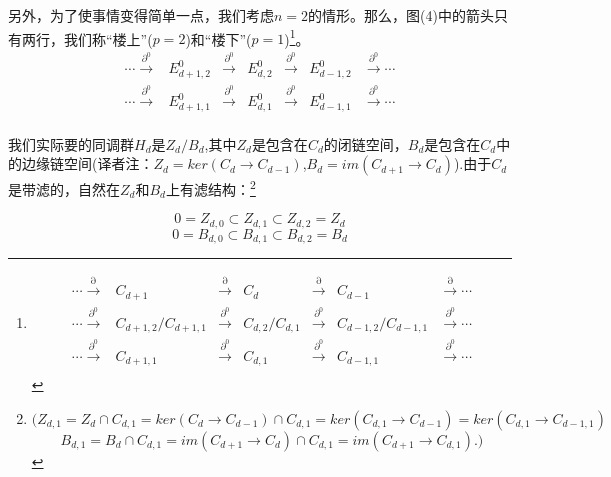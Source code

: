 \documentclass[a4paper,11pt,openany]{ctexart}
\begin{document}
另外，为了使事情变得简单一点，我们考虑$n=2$的情形。那么，图(4)中的箭头只有两行，我们称“楼上”($p=2$)和“楼下”($p=1$)\footnote{
\begin{equation*}
  \begin{array}{ccccccc}
  \cdots\xrightarrow{\partial}& C_{d+1} & \xrightarrow{\partial}&C_{d}&\xrightarrow{\partial}&C_{d-1}& \xrightarrow{\partial} \cdots \\
     \cdots\xrightarrow{\partial^0}& C_{d+1,2}/C_{d+1,1}& \xrightarrow{\partial^0}&C_{d,2}/C_{d,1}&\xrightarrow{\partial^0}&C_{d-1,2}/C_{d-1,1}& \xrightarrow{\partial^0} \cdots \\
     \cdots\xrightarrow{\partial^0}& C_{d+1,1} & \xrightarrow{\partial^0}&C_{d,1}&\xrightarrow{\partial^0}&C_{d-1,1}& \xrightarrow{\partial^0} \cdots \\
   \end{array}
\end{equation*}
}。
\begin{equation*}
  \begin{array}{ccccccc}
     \cdots\xrightarrow{\partial^0}& E_{d+1,2}^0& \xrightarrow{\partial^0}&E_{d,2}^0&\xrightarrow{\partial^0}&E_{d-1,2}^0& \xrightarrow{\partial^0} \cdots \\
     \cdots\xrightarrow{\partial^0}& E_{d+1,1}^0 & \xrightarrow{\partial^0}&E_{d,1}^0&\xrightarrow{\partial^0}&E_{d-1,1}^0& \xrightarrow{\partial^0} \cdots \\
   \end{array}
\end{equation*}

我们实际要的同调群$H_d$是$Z_d/B_d$,其中$Z_d$是包含在$C_d$的闭链空间，$B_d$是包含在$C_d$中的边缘链空间(译者注：$Z_d=ker(C_{d}\to C_{d-1})$,$B_d=im(C_{d+1}\to C_d)$).由于$C_d$是带滤的，自然在$Z_d$和$B_d$上有滤结构：\footnote{\[(Z_{d,1}=Z_d\cap C_{d,1}=ker(C_{d}\to C_{d-1})\cap C_{d,1}=ker(C_{d,1}\to C_{d-1})=ker(C_{d,1}\to C_{d-1,1})\]
\[B_{d,1}=B_d\cap C_{d,1}=im(C_{d+1}\to C_{d})\cap C_{d,1}=im(C_{d+1}\to C_{d,1}).)\]}

\[0=Z_{d,0}\subset Z_{d,1}\subset Z_{d,2}=Z_d\]
\[0=B_{d,0}\subset B_{d,1}\subset B_{d,2}=B_d\]
\end{document}
